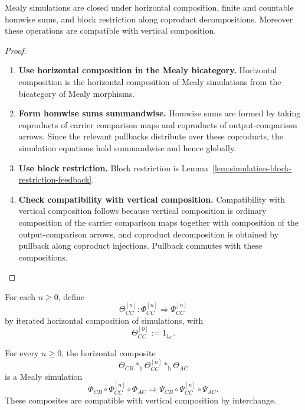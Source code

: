 \begin{lemma}
\label{lem:coproducts-composites-simulations-feedback}
Mealy simulations are closed under horizontal composition, finite and
countable homwise sums, and block restriction along coproduct decompositions.
Moreover these operations are compatible with vertical composition.
\end{lemma}

\begin{proof}
\begin{enumerate}
  \item \textbf{Use horizontal composition in the Mealy bicategory.}
  Horizontal composition is the horizontal composition of Mealy simulations
  from the bicategory of Mealy morphisms.

  \item \textbf{Form homwise sums summandwise.}
  Homwise sums are formed by taking coproducts of carrier comparison maps and
  coproducts of output-comparison arrows. Since the relevant pullbacks
  distribute over these coproducts, the simulation equations hold summandwise
  and hence globally.

  \item \textbf{Use block restriction.}
  Block restriction is Lemma~\ref{lem:simulation-block-restriction-feedback}.

  \item \textbf{Check compatibility with vertical composition.}
  Compatibility with vertical composition follows because vertical composition
  is ordinary composition of the carrier comparison maps together with
  composition of the output-comparison arrows, and coproduct decomposition is
  obtained by pullback along coproduct injections. Pullback commutes with
  these compositions.
\end{enumerate}
\end{proof}

For each \(n\geq 0\), define
\[
  \Theta_{CC}^{[n]}:
  \Phi_{CC}^{[n]}\Rightarrow\Psi_{CC}^{[n]}
\]
by iterated horizontal composition of simulations, with
\[
  \Theta_{CC}^{[0]}:=1_{1_C}.
\]

\begin{lemma}
\label{lem:finite-hidden-composites-simulations}
For every \(n\geq 0\), the horizontal composite
\[
  \Theta_{CB}
  \ast_{\mathrm h}
  \Theta_{CC}^{[n]}
  \ast_{\mathrm h}
  \Theta_{AC}
\]
is a Mealy simulation
\[
  \Phi_{CB}\circ\Phi_{CC}^{[n]}\circ\Phi_{AC}
  \Rightarrow
  \Psi_{CB}\circ\Psi_{CC}^{[n]}\circ\Psi_{AC}.
\]
These composites are compatible with vertical composition by interchange.
\end{lemma}

